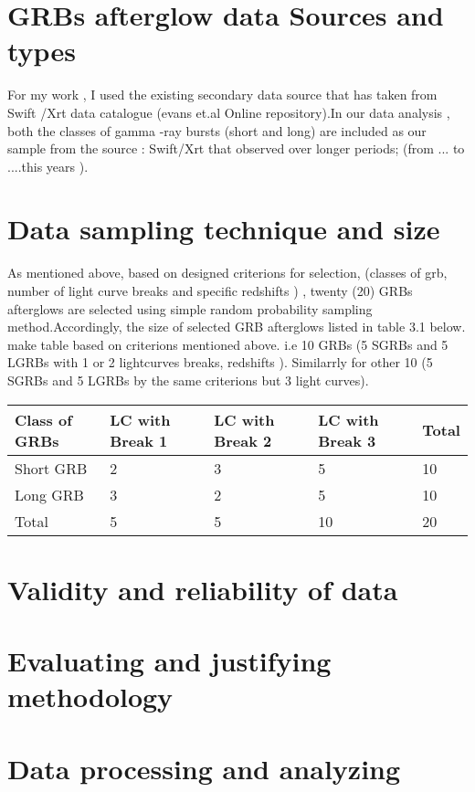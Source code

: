 \section{GRBs afterglow data Sources and types }
For my work , I used  the existing secondary data source  that has taken from Swift /Xrt data catalogue (evans et.al Online repository).In our data analysis , both the classes of gamma -ray bursts (short and long) are  included  as our sample from the source : Swift/Xrt that observed over longer periods; (from ...    to ....this years ).  
\section{Data sampling technique and size}
As mentioned above, based on designed criterions for selection,  (classes of grb, number of light curve breaks and specific redshifts ) , twenty (20) GRBs afterglows are selected using  simple random probability sampling method.Accordingly, the size  of selected GRB afterglows listed in table 3.1 below. make table based on criterions mentioned above. i.e 10 GRBs (5 SGRBs and 5 LGRBs with 1 or 2  lightcurves breaks, redshifts ). Similarrly for other 10 (5 SGRBs and 5 LGRBs  by the same criterions but 3 light curves). 
\begin{center}
\begin{table}
	\begin{tabular}{|l|l|l|l|l|}
		\hline
		Class of GRBs & LC with Break 1 & LC with Break 2 & LC with Break 3 & Total \\ \hline
		Short GRB & 2 & 3 & 5 & 10 \\ \hline
		Long GRB & 3 & 2 & 5 & 10 \\ \hline
		Total & 5 & 5 & 10 & 20 \\ \hline
	\end{tabular}
\end{table}
\end{center}
\section{Validity and reliability of data }

\section{Evaluating and justifying methodology}

 \section{Data processing and analyzing }

